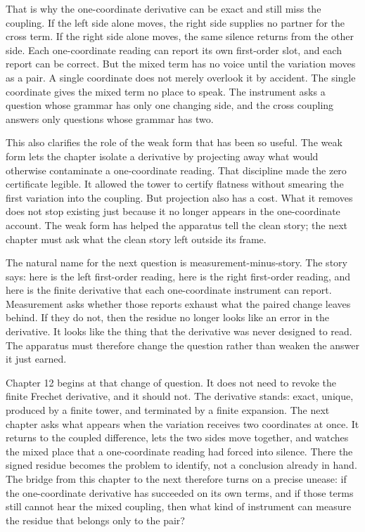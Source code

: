 That is why the one-coordinate derivative can be exact and still miss the
coupling. If the left side alone moves, the right side supplies no partner for
the cross term. If the right side alone moves, the same silence returns from
the other side. Each one-coordinate reading can report its own first-order
slot, and each report can be correct. But the mixed term has no voice until the
variation moves as a pair. A single coordinate does not merely overlook it by
accident. The single coordinate gives the mixed term no place to speak. The
instrument asks a question whose grammar has only one changing side, and the
cross coupling answers only questions whose grammar has two.

This also clarifies the role of the weak form that has been so useful. The
weak form lets the chapter isolate a derivative by projecting away what would
otherwise contaminate a one-coordinate reading. That discipline made the zero
certificate legible. It allowed the tower to certify flatness without smearing
the first variation into the coupling. But projection also has a cost. What it
removes does not stop existing just because it no longer appears in the
one-coordinate account. The weak form has helped the apparatus tell the clean
story; the next chapter must ask what the clean story left outside its frame.

The natural name for the next question is measurement-minus-story. The story
says: here is the left first-order reading, here is the right first-order
reading, and here is the finite derivative that each one-coordinate instrument
can report. Measurement asks whether those reports exhaust what the paired
change leaves behind. If they do not, then the residue no longer looks like an
error in the derivative. It looks like the thing that the derivative was never
designed to read. The apparatus must therefore change the question rather than
weaken the answer it just earned.

Chapter 12 begins at that change of question. It does not need to revoke the
finite Frechet derivative, and it should not. The derivative stands: exact,
unique, produced by a finite tower, and terminated by a finite expansion. The
next chapter asks what appears when the variation receives two coordinates at
once. It returns to the coupled difference, lets the two sides move together,
and watches the mixed place that a one-coordinate reading had forced into
silence. There the signed residue becomes the problem to identify, not a
conclusion already in hand. The bridge from this chapter to the next therefore
turns on a precise unease: if the one-coordinate derivative has succeeded on
its own terms, and if those terms still cannot hear the mixed coupling, then
what kind of instrument can measure the residue that belongs only to the pair?

